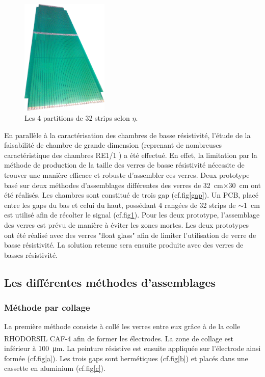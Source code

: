 \begin{figure}
	\vspace*{-1cm}
	\centering
	\includegraphics[width=0.37\textwidth]{GLA/strips.jpg}
	\caption{Les \num{4} partitions de \num{32} strips selon $\eta$.}
	\label{strips}
\end{figure}

En parallèle à la caractérisation des chambres de basse résistivité, l'étude de la faisabilité de chambre de grande dimension (reprenant de nombreuses caractéristique des chambres RE1/1 \cite{gapss}) a été effectué. En effet, la limitation par la méthode de production de la taille des verres de basse résistivité nécessite de trouver une manière efficace et robuste d'assembler ces verres.  Deux prototype basé sur deux méthodes d'assemblages différentes des verres de \SI{32}{\centi\meter}$\times$\SI{30}{\centi\meter} ont été réalisés. Les chambres sont constitué de trois gap (cf.fig\ref{gap}). Un PCB, placé entre les gaps du bas et celui du haut, possédant \num{4} rangées de \num{32} strips de $\sim$\SI{1}{\centi\meter} est utilisé afin de récolter le signal (cf.fig\ref{strips}). Pour les deux prototype, l'assemblage des verres est prévu de manière à éviter les zones mortes. Les deux prototypes ont été réalisé avec des verres "float glass" afin de limiter l'utilisation de verre de basse résistivité. La solution retenue sera ensuite produite avec des verres de basses résistivité.


\subsection{Les différentes méthodes d'assemblages} 
\subsubsection{Méthode par collage}
La première méthode consiste à collé les verres entre eux grâce à de la colle RHODORSIL\textsuperscript{\textregistered}
 CAF-4 afin de former les électrodes. La zone de collage est inférieur à \SI{100}{\micro\meter}. La peinture résistive est ensuite appliquée sur l'électrode ainsi formée (cf.fig\ref{a}). Les trois gaps sont hermétiques (cf.fig\ref{b}) et placés dans une cassette en aluminium (cf.fig\ref{c}).
 
